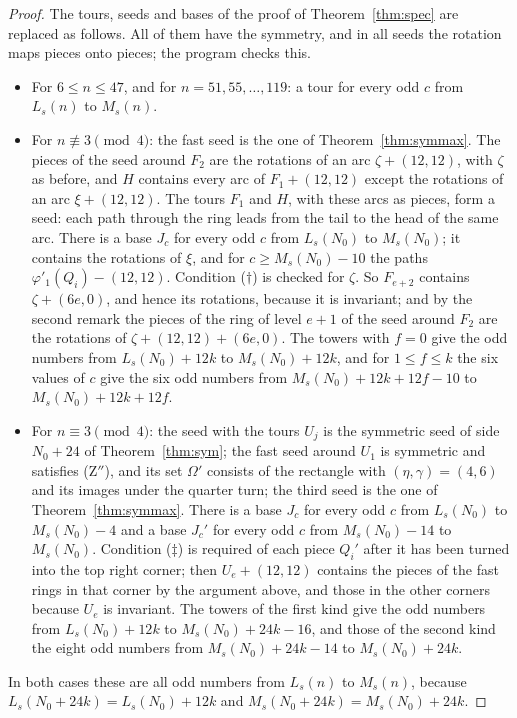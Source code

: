 \documentclass[11pt]{amsart}
\theoremstyle{remark}
\begin{document}
\begin{proof}
The tours, seeds and bases of the proof of Theorem~\ref{thm:spec} are replaced as follows. All of them have the
symmetry, and in all seeds the rotation maps pieces onto pieces; the program checks this.
\begin{itemize}
\item For $6\le n\le47$, and for $n=51,55,\dots,119$: a tour for every odd $c$ from $L_s(n)$ to $M_s(n)$.
\item For $n\not\equiv3\pmod 4$: the fast seed is the one of Theorem~\ref{thm:symmax}. The pieces of the seed around
$F_2$ are the rotations of an arc $\zeta+(12,12)$, with $\zeta$ as before, and $H$ contains every arc of
$F_1+(12,12)$ except the rotations of an arc $\xi+(12,12)$. The tours $F_1$ and $H$, with these arcs as pieces, form
a seed: each path through the ring leads from the tail to the head of the same arc. There is a base $J_c$ for every
odd $c$ from $L_s(N_0)$ to $M_s(N_0)$; it contains the rotations of $\xi$, and for $c\ge M_s(N_0)-10$ the paths
$\varphi'_1(Q_i)-(12,12)$. Condition ($\dagger$) is checked for $\zeta$. So $F_{e+2}$ contains $\zeta+(6e,0)$, and
hence its rotations, because it is invariant; and by the second remark the pieces of the ring of level $e+1$ of the
seed around $F_2$ are the rotations of $\zeta+(12,12)+(6e,0)$. The towers with $f=0$ give the odd numbers from $L_s(N_0)+12k$ to $M_s(N_0)+12k$, and
for $1\le f\le k$ the six values of $c$ give the six odd numbers from $M_s(N_0)+12k+12f-10$ to $M_s(N_0)+12k+12f$.
\item For $n\equiv3\pmod 4$: the seed with the tours $U_j$ is the symmetric seed of side $N_0+24$ of
Theorem~\ref{thm:sym}; the fast seed around $U_1$ is symmetric and satisfies (Z$''$), and its set $\Omega'$
consists of the rectangle with $(\eta,\gamma)=(4,6)$ and its images under the quarter turn; the third seed is the
one of
Theorem~\ref{thm:symmax}. There is a base $J_c$ for every odd $c$ from $L_s(N_0)$ to $M_s(N_0)-4$ and a base $J_c'$
for every odd $c$ from $M_s(N_0)-14$ to $M_s(N_0)$. Condition ($\ddagger$) is required of each piece $Q_i'$ after
it has been turned into the top right corner; then $U_e+(12,12)$ contains the pieces of the fast rings in that
corner by the argument above, and those in the other corners because $U_e$ is invariant. The towers of the first
kind give the odd numbers from $L_s(N_0)+12k$ to $M_s(N_0)+24k-16$, and those of the second kind the eight odd
numbers from $M_s(N_0)+24k-14$ to $M_s(N_0)+24k$.
\end{itemize}
In both cases these are all odd numbers from $L_s(n)$ to $M_s(n)$, because $L_s(N_0+24k)=L_s(N_0)+12k$ and
$M_s(N_0+24k)=M_s(N_0)+24k$.
\end{proof}
\end{document}
